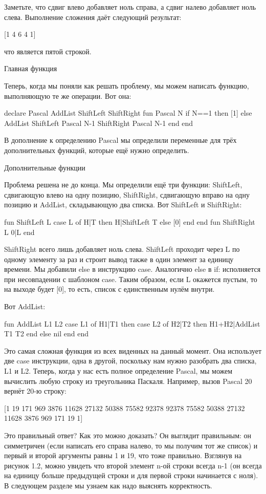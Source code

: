 Заметьте, что сдвиг влево добавляет ноль справа, а сдвиг налево добавляет ноль слева. Выполнение сложения даёт следующий результат:

[1 4 6 4 1]

что является пятой строкой.

Главная функция

Теперь, когда мы поняли как решать проблему, мы можем написать функцию, выполняющую те же операции. Вот она:

declare Pascal AddList ShiftLeft ShiftRight
fun {Pascal N}
if N==1 then [1]
else
{AddList {ShiftLeft {Pascal N-1}}
{ShiftRight {Pascal N-1}}}
end
end

В дополнение к определению Pascal мы определили переменные для трёх дополнительных функций, которые ещё нужно определить.

Дополнительные функции

Проблема решена не до конца. Мы определили ещё три функции: ShiftLeft, сдвигающую влево на одну позицию, ShiftRight, сдвигающую вправо на одну позицию и AddList, складывающую два списка. Вот ShiftLeft и ShiftRight:

fun {ShiftLeft L}
case L of H|T then
H|{ShiftLeft T}
else [0] end
end
fun {ShiftRight L} 0|L end

ShiftRight всего лишь добавляет ноль слева. ShiftLeft проходит через L по одному элементу за раз и строит вывод также в один элемент за единицу времени. Мы добавили else в инструкцию case. Аналогично else в if: исполняется при несовпадении с шаблоном case. Таким образом, если L окажется пустым, то на выходе будет [0], то есть, список с единственным нулём внутри.

Вот AddList:

fun {AddList L1 L2}
case L1 of H1|T1 then
case L2 of H2|T2 then
H1+H2|{AddList T1 T2}
end
else nil end
end

Это самая сложная функция из всех виденных на данный момент. Она использует две case инструкции, одна в другой, поскольку нам нужно разобрать два списка, L1 и L2. Теперь, когда у нас есть полное определение Pascal, мы можем вычислить любую строку из треугольника Паскаля. Например, вызов {Pascal 20} вернёт 20-ю строку:

[1 19 171 969 3876 11628 27132 50388 75582 92378 92378 75582 50388 27132 11628 3876 969 171 19 1]

Это правильный ответ? Как это можно доказать? Он выглядит правильным: он симметричен (если написать его справа налево, то мы получим тот же список) и первый и второй аргументы равны 1 и 19, что тоже правильно. Взглянув на рисунок 1.2, можно увидеть что второй элемент n-ой строки всегда n-1 (он всегда на единицу больше предыдущей строки и для первой строки начинается с ноля). В следующем разделе мы узнаем как надо выяснять корректность.

